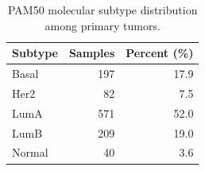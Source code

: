 \begin{table}[H]

\caption{\label{tab:export-latex-tables}PAM50 molecular subtype distribution among primary tumors.}
\centering
\begin{tabular}[t]{lrr}
\toprule
Subtype & Samples & Percent (\%)\\
\midrule
Basal & 197 & 17.9\\
Her2 & 82 & 7.5\\
LumA & 571 & 52.0\\
LumB & 209 & 19.0\\
Normal & 40 & 3.6\\
\bottomrule
\end{tabular}
\end{table}
